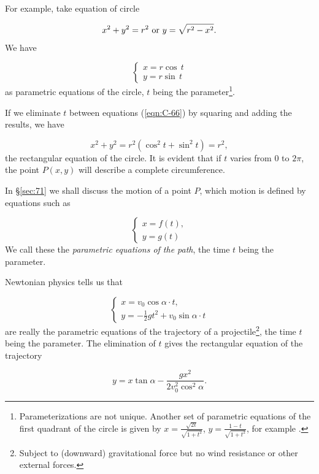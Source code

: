 \begin{example}
{\rm
For example, take equation of circle

\[
x^2 + y^2= r^2\ {\rm or}\  y = \sqrt{r^2 - x^2}.
\]
We have

\begin{equation}
\begin{cases} 
x= r\cos\, t \\ 
y  = r\sin\, t
\end{cases} 
\label{eqn:C-66}
\end{equation}	
as parametric equations of the circle, %
$t$ being the parameter\footnote{Parameterizations are not
unique. Another set of parametric 
equations of the first quadrant of the circle
is given by $x=\frac{\sqrt{2t}}{\sqrt{1+t^2}}$,
$y=\frac{1-t}{\sqrt{1+t^2}}$, for example%
.}.

If we eliminate $t$ between equations (\ref{eqn:C-66}) 
by squaring and adding the results, we have

\[
 x^2 + y^2 = r^2(\cos^2t + \sin^2t) = r^2,
\]
the rectangular equation of the circle. 
It is evident that if $t$ varies from $0$ to $2\pi$, 
the point $P(x,y)$ will describe a complete circumference.
}
\end{example}

In \S \ref{sec:71} %
we shall discuss the motion of a point $P$, which motion is 
defined by equations such as

\[
\begin{cases}
x = f(t), \\ 
y=g(t) 
\end{cases}
\]
We call these the {\it parametric equations of the path}, 
the time $t$ being the parameter. 

\begin{example}
{\rm
Newtonian physics tells us that %

\[
\begin{cases} 
x = v_0 \cos \alpha \cdot t, \\ 
y = -\frac{1}{2} gt^2 + v_0 \sin \alpha \cdot t 
\end{cases}
\]
are really the parametric equations of the trajectory 
of a projectile\footnote{Subject to (downward) gravitational
force but no wind resistance or other external forces.}, %
the time $t$ being the parameter. The elimination of $t$ 
gives the rectangular equation of the trajectory

\[
  y = x \tan \alpha - \frac{gx^2}{2v_0^2 \cos^2 \alpha}.
\]

}
\end{example}

